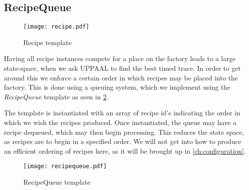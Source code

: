 \subsection{RecipeQueue}\label{subs:recipequeue}

\begin{figure}[h]
\centering
\texttt{[image: recipe.pdf]}
\caption{Recipe template}
\label{fig:recipe}
\end{figure}

Having all recipe instances compete for a place on the factory leads to a large state-space, when we ask UPPAAL to find the best timed trace. In order to get around this we enforce a certain order in which recipes may be placed into the factory.  This is done using a queuing system, which we implement using the \emph{RecipeQueue} template as seen in \cref{fig:recipequeue}.

The template is instantiated with an array of recipe id's indicating the order in which we wish the recipes produced. Once instantiated, the queue may have a recipe dequeued, which may then begin processing. This reduces the state space, as recipes are to begin in a specified order. We will not get into how to produce an efficient ordering of recipes here, as it will be brought up in \cref{ch:configuration}.

\begin{figure}[h]
\centering
\texttt{[image: recipequeue.pdf]}
\caption{RecipeQueue template}
\label{fig:recipequeue}
\end{figure}